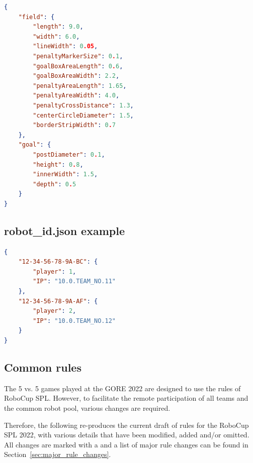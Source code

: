 \begin{lstlisting}[language=json,firstnumber=1]
{
    "field": {
        "length": 9.0,
        "width": 6.0,
        "lineWidth": 0.05,
        "penaltyMarkerSize": 0.1,
        "goalBoxAreaLength": 0.6,
        "goalBoxAreaWidth": 2.2,
        "penaltyAreaLength": 1.65,
        "penaltyAreaWidth": 4.0,
        "penaltyCrossDistance": 1.3,
        "centerCircleDiameter": 1.5,
        "borderStripWidth": 0.7
    },
    "goal": {
        "postDiameter": 0.1,
        "height": 0.8,
        "innerWidth": 1.5,
        "depth": 0.5
    }
}
\end{lstlisting}


\subsection{robot\_id.json example}
\label{sec:robotidjson}

\begin{lstlisting}[language=json,firstnumber=1]
{
    "12-34-56-78-9A-BC": {
        "player": 1,
        "IP": "10.0.TEAM_NO.11"
    },
    "12-34-56-78-9A-AF": {
        "player": 2,
        "IP": "10.0.TEAM_NO.12"
    }
}
\end{lstlisting}

\subsection{Common rules}
\label{sec:Common_rules}
The 5 vs. 5 games played at the GORE 2022 are designed to use the rules of RoboCup SPL. However, to facilitate the remote participation of all teams and the common robot pool, various changes are required.

Therefore, the following re-produces the current draft of rules for the RoboCup SPL 2022, with various details that have been modified, added and/or omitted. All changes are marked with a  and a list of major rule changes can be found in Section~\ref{sec:major_rule_changes}.

